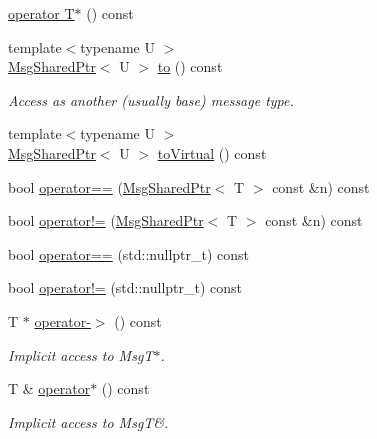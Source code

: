 \begin{DoxyCompactItemize}
\item 
\hyperlink{structvt_1_1messaging_1_1_msg_shared_ptr_a85b58c8af4068d8cfd4ad2ebb02d8111}{operator T$\ast$} () const
\item 
{\footnotesize template$<$typename U $>$ }\\\hyperlink{structvt_1_1messaging_1_1_msg_shared_ptr}{Msg\+Shared\+Ptr}$<$ U $>$ \hyperlink{structvt_1_1messaging_1_1_msg_shared_ptr_ae3d838b37f94f5f63ffc433518d46ada}{to} () const
\begin{DoxyCompactList}\small\item\em Access as another (usually base) message type. \end{DoxyCompactList}\item 
{\footnotesize template$<$typename U $>$ }\\\hyperlink{structvt_1_1messaging_1_1_msg_shared_ptr}{Msg\+Shared\+Ptr}$<$ U $>$ \hyperlink{structvt_1_1messaging_1_1_msg_shared_ptr_ab210c87a0489113368209634e76a72b8}{to\+Virtual} () const
\item 
bool \hyperlink{structvt_1_1messaging_1_1_msg_shared_ptr_a7f385be5d82602555a25a6737c779962}{operator==} (\hyperlink{structvt_1_1messaging_1_1_msg_shared_ptr}{Msg\+Shared\+Ptr}$<$ T $>$ const \&n) const
\item 
bool \hyperlink{structvt_1_1messaging_1_1_msg_shared_ptr_a1a37a82a49f68a91ef92ec675d2a324e}{operator!=} (\hyperlink{structvt_1_1messaging_1_1_msg_shared_ptr}{Msg\+Shared\+Ptr}$<$ T $>$ const \&n) const
\item 
bool \hyperlink{structvt_1_1messaging_1_1_msg_shared_ptr_a7da24c983c0b606a570138d928148298}{operator==} (std\+::nullptr\+\_\+t) const
\item 
bool \hyperlink{structvt_1_1messaging_1_1_msg_shared_ptr_a3d21051f673b7370ac6dcdaeac110e84}{operator!=} (std\+::nullptr\+\_\+t) const
\item 
T $\ast$ \hyperlink{structvt_1_1messaging_1_1_msg_shared_ptr_a4140dc4ea157de37d258c8f8821179c8}{operator-\/$>$} () const
\begin{DoxyCompactList}\small\item\em Implicit access to Msg\+T$\ast$. \end{DoxyCompactList}\item 
T \& \hyperlink{structvt_1_1messaging_1_1_msg_shared_ptr_a609cd3703233ec7a0e26db0ff457b8f7}{operator$\ast$} () const
\begin{DoxyCompactList}\small\item\em Implicit access to MsgT\&. \end{DoxyCompactList}\item 

\end{DoxyCompactItemize}
